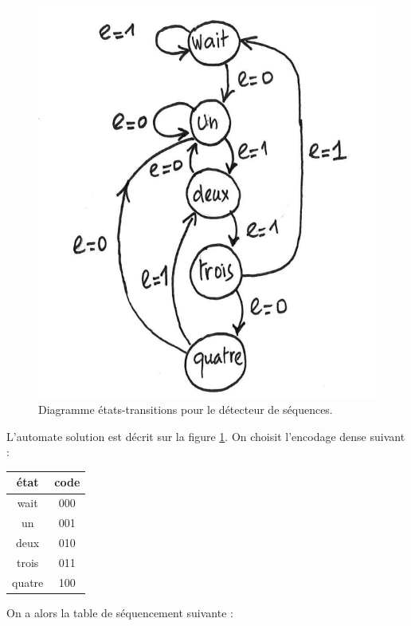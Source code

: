 \documentclass[a4paper,11pt]{article}
\begin{document}

\begin{figure}[!h]
  \begin{center}
    \includegraphics[scale=0.3]{./figures/fsm_detect}
  \end{center}
  \caption{Diagramme états-transitions pour le détecteur de séquences.}
  \label{fsm_detect}
\end{figure}

L'automate solution est décrit sur la figure \ref{fsm_detect}. On choisit l'encodage dense suivant :
\begin{table}[h!]
\begin{tabular}{c|c}
  état   & code \\ \hline
  wait   & 000 \\
  un     & 001 \\
  deux   & 010 \\
  trois  & 011 \\
  quatre & 100 \\
\end{tabular}
\end{table}

On a alors la table de séquencement suivante :\\
\end{document}
